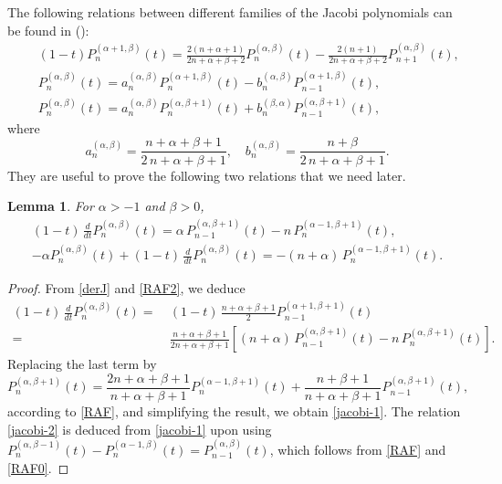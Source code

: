 \documentclass{amsart}
\theoremstyle{plain}%
\newtheorem{lem}[thm]{Lemma}
\theoremstyle{definition}
\theoremstyle{remark}
\begin{document}
The following relations between different families of the Jacobi polynomials can be found in 
(\cite[Chapt. 22]{AS}):
\begin{eqnarray}
&~& (1-t) P_n^{(\alpha+1,\beta)}(t) = \frac{2(n+\alpha+1)}{2n+\alpha+\beta+2}P_n^{(\alpha,\beta)}(t) - \frac{2(n+1)}{2n+\alpha+\beta+2}P_{n+1}^{(\alpha,\beta)}(t),\label{RAF2}\\
&~& P_n^{(\alpha,\beta)}(t) = a_n^{(\alpha,\beta)} P_n^{(\alpha+1,\beta)}(t) - b_n^{(\alpha,\beta)}P_{n-1}^{(\alpha+1,\beta)}(t),\label{RAF}\\
&~& P_n^{(\alpha,\beta)}(t) = a_n^{(\alpha,\beta)} P_n^{(\alpha,\beta+1)}(t) + b_n^{(\beta,\alpha)}P_{n-1}^{(\alpha,\beta+1)}(t),\label{RAF0}
\end{eqnarray}
where
\begin{equation}\label{coef-a-b}
a_n^{(\alpha,\beta)} = \frac{n+\alpha+\beta+1}{2\,n + \alpha + \beta+1}, \quad b_n^{(\alpha,\beta)} = \frac{n+\beta}{2\,n + \alpha + \beta+1}.
\end{equation}
They are useful to prove the following two relations that we need later. 

\begin{lem} \label{lem:Jacobi-recur}
For $\alpha > -1$ and $\beta > 0$, 
\begin{align}
(1-t)\,\frac{d}{d t} P_n^{(\alpha,\beta)}(t) = \alpha \, P_{n-1}^{(\alpha,\beta+1)}(t) - n \,P_n^{(\alpha-1,\beta+1)}(t),
   \label{jacobi-1} \\
-\alpha P_{n}^{(\alpha,\beta)}(t) + (1-t)\,\frac{d}{d t} P_n^{(\alpha,\beta)}(t) = -(n+\alpha) \,P_n^{(\alpha-1,\beta+1)}(t).
\label{jacobi-2}
\end{align}
\end{lem}

\begin{proof}
From \eqref{derJ} and \eqref{RAF2}, we deduce
\begin{align*}
(1-t)\,\frac{d}{d t} P_n^{(\alpha,\beta)}(t) =\ & (1-t)\,\frac{n+\alpha+\beta +1}{2}P_{n-1}^{(\alpha+1,\beta+1)}(t)\\
=\ & \frac{n+\alpha+\beta+1}{2n+\alpha+\beta+1} \left[(n+\alpha)\,P_{n-1}^{(\alpha,\beta+1)}(t) - n\,P_n^{(\alpha,\beta+1)}(t)\right].
\end{align*}
Replacing the last term by 
\[
P_{n}^{(\alpha,\beta+1)}(t) = \frac{2n+\alpha+ \beta +1}{n+\alpha + \beta +1}P_{n}^{(\alpha-1,\beta+1)}(t)+
\frac{n+\beta + 1}{n+\alpha + \beta +1}P_{n-1}^{(\alpha,\beta+1)}(t),
\]
according to \eqref{RAF}, and simplifying the result, we obtain \eqref{jacobi-1}. The relation \eqref{jacobi-2} is deduced from 
\eqref{jacobi-1} upon using $P_n^{(\alpha,\beta-1)}(t) - P_n^{(\alpha-1,\beta)}(t) = P_{n-1}^{(\alpha,\beta)}(t)$,
which follows from \eqref{RAF} and \eqref{RAF0}.
\end{proof}
\end{document}

